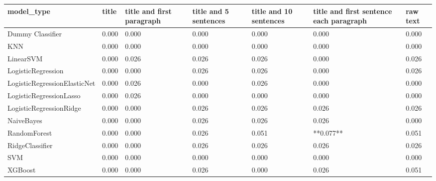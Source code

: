 \begin{tabular}{lllllll}
\toprule
                  model\_type & title & title and first paragraph & title and 5 sentences & title and 10 sentences & title and first sentence each paragraph & raw text \\
\midrule
            Dummy Classifier & 0.000 &                     0.000 &                 0.000 &                  0.000 &                                   0.000 &    0.000 \\
                         KNN & 0.000 &                     0.000 &                 0.000 &                  0.000 &                                   0.000 &    0.000 \\
                   LinearSVM & 0.000 &                     0.026 &                 0.026 &                  0.026 &                                   0.000 &    0.026 \\
          LogisticRegression & 0.000 &                     0.000 &                 0.026 &                  0.026 &                                   0.000 &    0.026 \\
LogisticRegressionElasticNet & 0.000 &                     0.026 &                 0.000 &                  0.026 &                                   0.000 &    0.000 \\
     LogisticRegressionLasso & 0.000 &                     0.026 &                 0.000 &                  0.000 &                                   0.000 &    0.000 \\
     LogisticRegressionRidge & 0.000 &                     0.000 &                 0.026 &                  0.026 &                                   0.026 &    0.026 \\
                  NaiveBayes & 0.000 &                     0.000 &                 0.026 &                  0.026 &                                   0.026 &    0.000 \\
                RandomForest & 0.000 &                     0.000 &                 0.026 &                  0.051 &                               **0.077** &    0.051 \\
             RidgeClassifier & 0.000 &                     0.000 &                 0.026 &                  0.026 &                                   0.026 &    0.026 \\
                         SVM & 0.000 &                     0.000 &                 0.000 &                  0.000 &                                   0.000 &    0.000 \\
                     XGBoost & 0.000 &                     0.000 &                 0.026 &                  0.000 &                                   0.026 &    0.051 \\
\bottomrule
\end{tabular}
